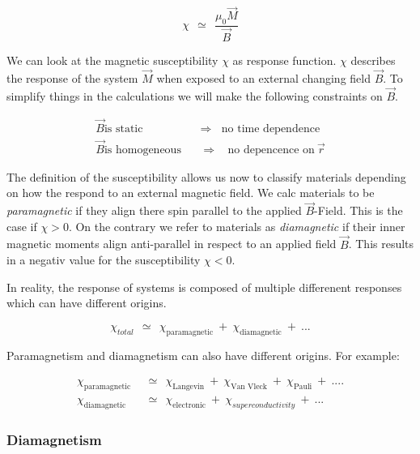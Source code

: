 \documentclass[10pt]{report}
\numberwithin{equation}{chapter}
\begin{document}
\begin{equation} \label{eq:mag_suscept}
  \chi ~~≃~~ \frac{\mu_0 \vec{M}}{\vec{B}}
\end{equation}

We can look at the magnetic susceptibility $\chi$ as response function. $\chi$ describes the response of the system $\vec{M}$ when exposed to an external changing field $\vec{B}$.
To simplify things in the calculations we will make the following constraints on $\vec{B}$.

\begin{align*}
  \vec{B} \text{is static} ~~~~ &  \Rightarrow  ~~~~ \text{no time dependence}\\
  \vec{B} \text{is homogeneous} ~~~~ & \Rightarrow  ~~~~ \text{no depencence on}\ \vec{r}
\end{align*}


The definition of the susceptibility allows us now to classify materials depending on how the respond to an external magnetic field. We calc materials to be \textit{paramagnetic} if they align there spin parallel to the applied $\vec{B}$-Field. This is the case if $\chi > 0$. On the contrary we refer to materials as \textit{diamagnetic} if their inner magnetic moments align anti-parallel in respect to an applied field $\vec{B}$. This results in a negativ value for the susceptibility $\chi < 0$.

In reality, the response of systems is composed of multiple differenent responses which can have different origins.

\begin{equation}
  \chi_{total} ~~≃~~ \chi_\text{paramagnetic} ~+~ \chi_\text{diamagnetic} ~+~ ...
\end{equation}

Paramagnetism and diamagnetism can also have different origins. For example:

\begin{align*}
  \chi_\text{paramagnetic} ~~& ≃~~ \chi_\text{Langevin} ~+~ \chi_\text{Van Vleck} ~+~ \chi_\text{Pauli} ~+~ ....\\
  \chi_\text{diamagnetic} ~~& ≃~~ \chi_\text{electronic} ~+~ \chi_{superconductivity} ~+~ ...  
\end{align*}



\subsubsection{Diamagnetism}
\end{document}
